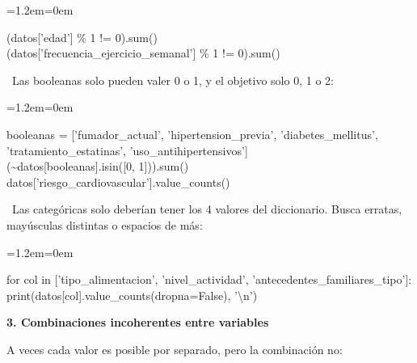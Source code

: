 \documentclass[11pt,a4paper]{article}
\newenvironment{codigo}
  {\par\smallskip\begin{list}{}{\leftmargin=1.2em\rightmargin=0em}\item\relax\ttfamily\scriptsize\raggedright}
  {\end{list}\smallskip}
\begin{document}
{\begin{codigo}
\hspace*{1.04em}(datos['edad'] \% 1 != 0).sum() \\{}
\hspace*{1.04em}(datos['frecuencia\_\allowbreak{}ejercicio\_\allowbreak{}semanal'] \% 1 != 0).sum()
\end{codigo}
\hspace*{1.0em}\textbullet~Las booleanas solo pueden valer 0 o 1, y el objetivo solo 0, 1 o 2:

\begin{codigo}
\hspace*{1.04em}booleanas = ['fumador\_\allowbreak{}actual', 'hipertension\_\allowbreak{}previa', 'diabetes\_\allowbreak{}mellitus', \\{}
\hspace*{7.80em}'tratamiento\_\allowbreak{}estatinas', 'uso\_\allowbreak{}antihipertensivos'] \\{}
\hspace*{1.04em}(\textasciitilde{}datos[booleanas].isin([0, 1])).sum() \\{}
\hspace*{1.04em}datos['riesgo\_\allowbreak{}cardiovascular'].value\_\allowbreak{}counts()
\end{codigo}
\hspace*{1.0em}\textbullet~Las categóricas solo deberían tener los 4 valores del diccionario. Busca erratas, mayúsculas distintas o espacios de más:

\begin{codigo}
\hspace*{1.04em}for col in ['tipo\_\allowbreak{}alimentacion', 'nivel\_\allowbreak{}actividad', 'antecedentes\_\allowbreak{}familiares\_\allowbreak{}tipo']: \\{}
\hspace*{3.12em}print(datos[col].value\_\allowbreak{}counts(dropna=False), '\textbackslash\allowbreak{}n')
\end{codigo}
\textbf{3. Combinaciones incoherentes entre variables}

A veces cada valor es posible por separado, pero la combinación no:

}
\end{document}
